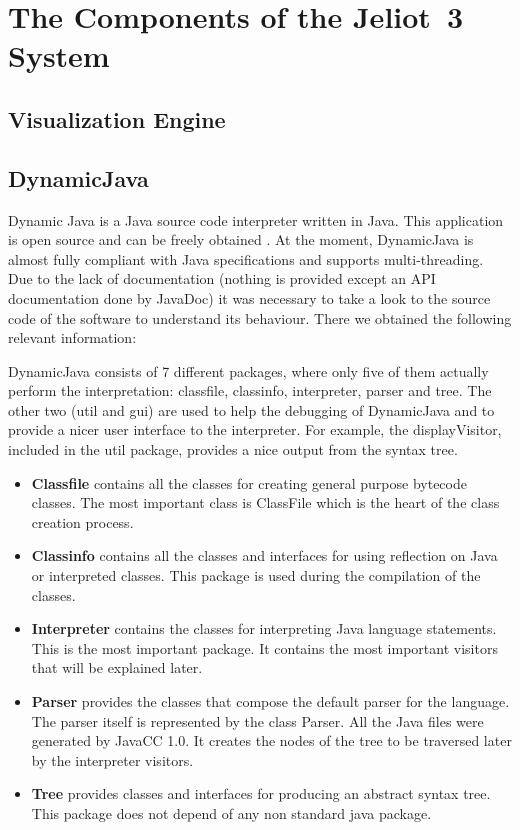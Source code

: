 \section{The Components of the Jeliot~3 System}
\label{sec:The_Components_of_the_Jeliot_3_System}




\subsection{Visualization Engine}
\label{sec:Visualization_Engine}




\subsection{DynamicJava}
\label{sec:DynamicJava}

Dynamic Java is a Java source code interpreter written in Java. This application is open source and can be freely obtained . At the moment, DynamicJava is almost fully compliant with Java specifications and supports multi-threading. Due to the lack of documentation (nothing is provided except an API documentation done by JavaDoc) it was necessary to take a look to the source code of the software to understand its behaviour. There we obtained the following relevant information:

DynamicJava consists of 7 different packages, where only five of them actually perform the interpretation: classfile, classinfo, interpreter, parser and tree. The other two (util and gui) are used to help the debugging of DynamicJava and to provide a nicer user interface to the interpreter. For example, the displayVisitor, included in the util package, provides a nice output from the syntax tree.

\begin{itemize}
\item {\bf{Classfile}} contains all the classes for creating general purpose bytecode classes. The most important class is ClassFile which is the heart of the class creation process.
\item {\bf{Classinfo}} contains all the classes and interfaces for using reflection on Java or interpreted classes. This package is used during the compilation of the classes.
\item {\bf{Interpreter}} contains the classes for interpreting Java language statements. This is the most important package. It contains the most important visitors that will be explained later.
\item {\bf{Parser}} provides the classes that compose the default parser for the language. The parser itself is represented by the class Parser. All the Java files were generated by JavaCC 1.0. It creates the nodes of the tree to be traversed later by the interpreter visitors.
\item {\bf{Tree}} provides classes and interfaces for producing an abstract syntax tree. This package does not depend of any non standard java package.
\end{itemize}

